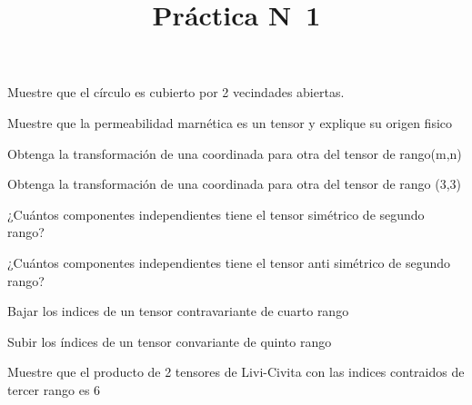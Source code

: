 \documentclass[12pt,a4paper]{practice}
\begin{document}
    \title{Práctica N\textdegree\ 1}
    \maketitle

    \begin{problem}\label{prob:1}
        Muestre que el círculo es cubierto por 2 vecindades abiertas.
    \end{problem}

    \begin{problem}\label{prob:2}
        Muestre que la permeabilidad marnética es un tensor y explique su origen fisico    
    \end{problem}
    
    \begin{problem}\label{prob:3}
        Obtenga la transformación de una coordinada para otra del tensor de rango(m,n)    
    \end{problem}
    
    \begin{problem}\label{prob:4}
        Obtenga la transformación de una coordinada para otra del tensor de rango (3,3)
    \end{problem}

    \begin{problem}\label{prob:5}
        ¿Cuántos componentes independientes tiene el tensor simétrico de segundo rango?    
    \end{problem}

    \begin{problem}\label{prob:6}
        ¿Cuántos componentes independientes tiene el tensor anti simétrico de segundo rango?    
    \end{problem}
    
    \begin{problem}\label{prob:7}
        Bajar los indices de un tensor contravariante de cuarto rango    
    \end{problem}
    
    \begin{problem}\label{prob:8}
        Subir los índices de un tensor convariante de quinto rango
    \end{problem}

    \begin{problem}\label{prob:9}
        Muestre que el producto de 2 tensores de Livi-Civita con las indices contraidos de tercer rango es 6
    \end{problem}
    
\end{document}
